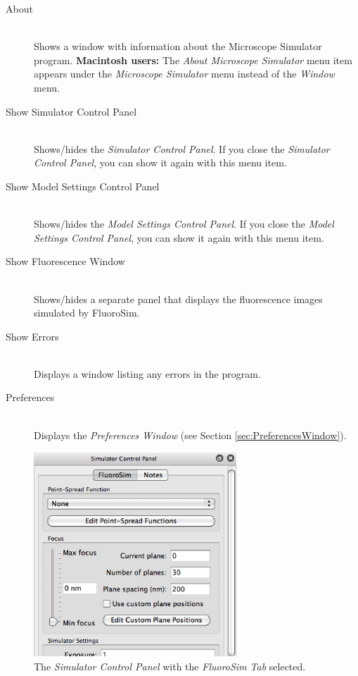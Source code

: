 \documentclass[11pt,titlepage,twoside]{article}
\begin{document}
\begin{description}

  \item[About] \hfill \\
  Shows a window with information about the Microscope Simulator program. \textbf{Macintosh users:} The \emph{About Microscope Simulator} menu item appears under the \emph{Microscope Simulator} menu instead of the \emph{Window} menu. 

  \item[Show Simulator Control Panel] \hfill \\
  Shows/hides the \emph{Simulator Control Panel}. If you close the \emph{Simulator Control Panel}, you can show it again with this menu item.
  
  \item[Show Model Settings Control Panel] \hfill \\
    Shows/hides the \emph{Model Settings Control Panel}. If you close the \emph{Model Settings Control Panel}, you can show it again with this menu item.
  
  \item[Show Fluorescence Window] \hfill \\
  Shows/hides a separate panel that displays the fluorescence images simulated by FluoroSim.
  
  \item[Show Errors] \hfill \\
  Displays a window listing any errors in the program.
  
  \item[Preferences] \hfill \\
  Displays the \emph{Preferences Window} (see Section \ref{sec:PreferencesWindow}).

\end{description}

\begin{figure}[htbp] %
   \centering
   \includegraphics[width=3in]{images/SimulatorControlPanel} 
   \caption{The \emph{Simulator Control Panel} with the \emph{FluoroSim Tab} selected.}
   \label{fig:SimulatorControlPanel}
\end{figure}
\end{document}

